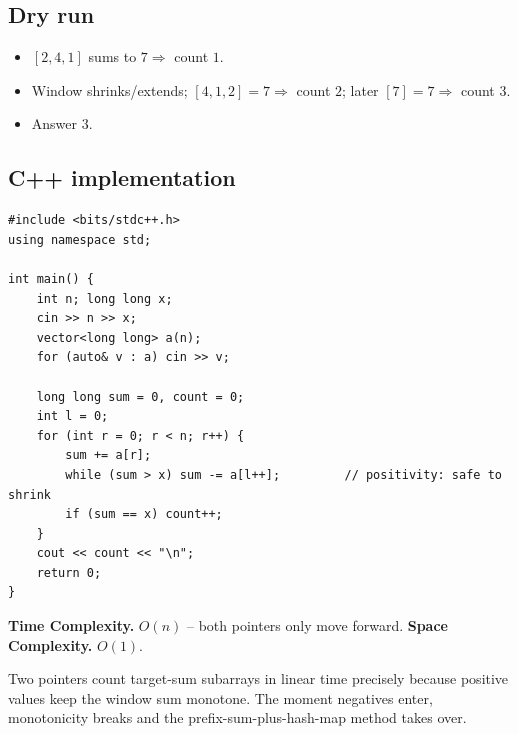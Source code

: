 \subsection*{Dry run}


\begin{itemize}
  \item $[2,4,1]$ sums to $7\Rightarrow$ count $1$.
  \item Window shrinks/extends; $[4,1,2]=7\Rightarrow$ count $2$; later
        $[7]=7\Rightarrow$ count $3$.
  \item Answer $3$.
\end{itemize}

\subsection*{C++ implementation}

\begin{lstlisting}
#include <bits/stdc++.h>
using namespace std;

int main() {
    int n; long long x;
    cin >> n >> x;
    vector<long long> a(n);
    for (auto& v : a) cin >> v;

    long long sum = 0, count = 0;
    int l = 0;
    for (int r = 0; r < n; r++) {
        sum += a[r];
        while (sum > x) sum -= a[l++];         // positivity: safe to shrink
        if (sum == x) count++;
    }
    cout << count << "\n";
    return 0;
}
\end{lstlisting}

\begin{complexitybox}
\textbf{Time Complexity.} $O(n)$ -- both pointers only move forward.
\textbf{Space Complexity.} $O(1)$.
\end{complexitybox}

\begin{takeawaybox}
Two pointers count target-sum subarrays in linear time precisely because
positive values keep the window sum monotone. The moment negatives enter,
monotonicity breaks and the prefix-sum-plus-hash-map method takes over.
\end{takeawaybox}
